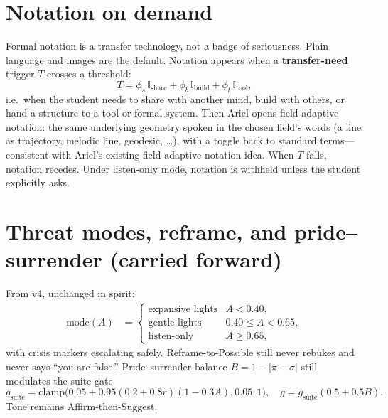 \documentclass[11pt, a4paper]{article}
\begin{document}
\section{Notation on demand}
Formal notation is a transfer technology, not a badge of seriousness. Plain language and images are the default. Notation appears when a \textbf{transfer-need} trigger $T$ crosses a threshold:
\begin{equation}
T = \phi_s\,\mathbb{I}_{\mathrm{share}} + \phi_b\,\mathbb{I}_{\mathrm{build}} + \phi_t\,\mathbb{I}_{\mathrm{tool}},
\end{equation}
i.e.\ when the student needs to share with another mind, build with others, or hand a structure to a tool or formal system. Then Ariel opens field-adaptive notation: the same underlying geometry spoken in the chosen field's words (a line as trajectory, melodic line, geodesic, \ldots), with a toggle back to standard terms---consistent with Ariel's existing field-adaptive notation idea. When $T$ falls, notation recedes. Under listen-only mode, notation is withheld unless the student explicitly asks.

\section{Threat modes, reframe, and pride--surrender (carried forward)}
From v4, unchanged in spirit:
\begin{align}
\mathrm{mode}(A) &=
\begin{cases}
\text{expansive lights} & A < 0.40,\\
\text{gentle lights} & 0.40\le A < 0.65,\\
\text{listen-only} & A \ge 0.65,
\end{cases}
\end{align}
with crisis markers escalating safely. Reframe-to-Possible still never rebukes and never says ``you are false.'' Pride--surrender balance $B=1-|\pi-\sigma|$ still modulates the suite gate
\begin{equation}
g_{\mathrm{suite}}=\mathrm{clamp}\big(0.05+0.95(0.2+0.8r)(1-0.3A),0.05,1\big),\quad
g=g_{\mathrm{suite}}(0.5+0.5B).
\end{equation}
Tone remains Affirm-then-Suggest.
\end{document}
